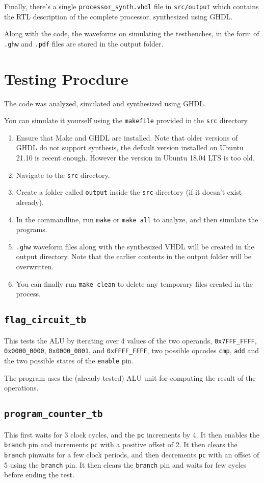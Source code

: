 \documentclass[a4paper]{scrartcl}
\renewcommand{\tt}{\texttt}
\begin{document}
Finally, there's a single \tt{processor_synth.vhdl} file in \tt{src/output} which contains the RTL description of the complete processor, synthesized using GHDL.

Along with the code, the waveforms on simulating the testbenches, in the form of \tt{.ghw} and \tt{.pdf} files are stored in the output folder.

\section{Testing Procdure}
The code was analyzed, simulated and synthesized using GHDL.

You can simulate it yourself using the \tt{makefile} provided in the \tt{src} directory.
\begin{enumerate}
	\item Ensure that Make and GHDL are installed. Note that older versions of GHDL do not support synthesis, the default version installed on Ubuntu 21.10 is recent enough.
		However the version in Ubuntu 18.04 LTS is too old.
	\item Navigate to the \tt{src} directory.
	\item Create a folder called \tt{output} inside the \tt{src} directory (if it doesn't exist already).
	\item In the commandline, run \tt{make} or \tt{make all} to analyze, and then simulate the programs.
	\item \tt{.ghw} waveform files along with the synthesized VHDL will be created in the output directory. Note that the earlier contents in the output folder will be overwritten.
	\item You can finally run \tt{make clean} to delete any temporary files created in the process.
\end{enumerate}

\subsection*{\tt{flag_circuit_tb}}
This tests the ALU by iterating over 4 values of the two operands, \tt{0x7FFF_FFFF}, \tt{0x0000_0000}, \tt{0x0000_0001}, and \tt{0xFFFF_FFFF}, two possible opcodes \tt{cmp}, \tt{add} and the two possible states of the \tt{enable} pin.

The program uses the (already tested) ALU unit for computing the result of the operations.

\subsection*{\tt{program_counter_tb}}
This first waits for 3 clock cycles, and the \tt{pc} increments by 4. It then enables the \tt{branch} pin and increments \tt{pc} with a positive offset of 2. It then clears the \tt{branch} pinwaits for a few clock periods, and then decrements \tt{pc} with an offset of 5 using the \tt{branch} pin. It then clears the \tt{branch} pin and waits for few cycles before ending the test.
\end{document}
